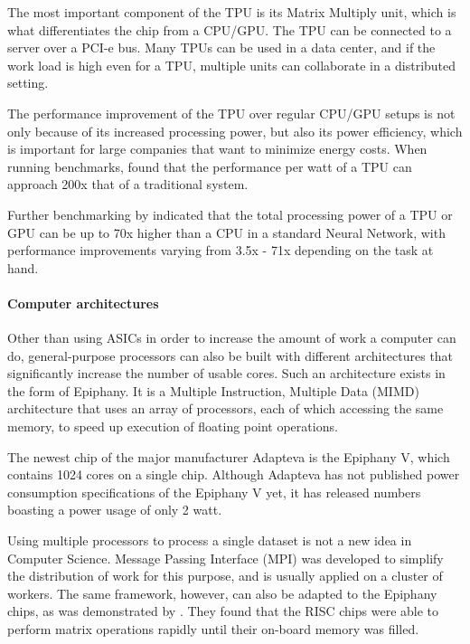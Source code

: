 The most important component of the TPU is its Matrix Multiply unit, which is what differentiates the chip from a CPU/GPU. The TPU can be connected to a server over a PCI-e bus. Many TPUs can be used in a data center, and if the work load is high even for a TPU, multiple units can collaborate in a distributed setting.

The performance improvement of the TPU over regular CPU/GPU setups is not only because of its increased processing power, but also its power efficiency, which is important for large companies that want to minimize energy costs. When running benchmarks, \citet{Joup17} found that the performance per watt of a TPU can approach 200x that of a traditional system.

Further benchmarking by \citet{Sato17} indicated that the total processing power of a TPU or GPU can be up to 70x higher than a CPU in a standard Neural Network, with performance improvements varying from 3.5x - 71x depending on the task at hand.


\paragraph{Computer architectures}
Other than using ASICs in order to increase the amount of work a computer can do,
general-purpose processors can also be built with different architectures that significantly increase the number of usable cores. Such an architecture exists in the form of Epiphany. It is a Multiple Instruction, Multiple Data (MIMD) architecture that uses an array of processors, each of which accessing the
same memory, to speed up execution of floating point operations\cite{Olof16}.

The newest chip of the major manufacturer Adapteva is the Epiphany V, which contains
1024 cores on a single chip\cite{Olof16}. Although Adapteva has not published power consumption specifications of the Epiphany V yet, it has released numbers boasting a power usage of only 2 watt\cite{Adap}.

Using multiple processors to process a single dataset is not a new idea in Computer Science. Message Passing Interface (MPI)\cite{MPI1993} was developed to simplify the distribution of work for this purpose, and is usually applied on a cluster of workers. The same framework, however, can also be adapted to the Epiphany chips, as was demonstrated by \citep{Rich15}. They found that the RISC chips were able to perform matrix operations rapidly until their on-board memory was filled.

